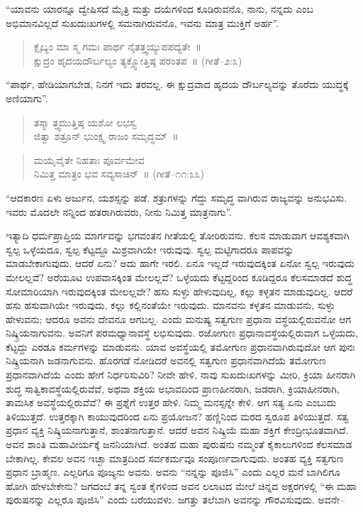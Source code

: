 “ಯಾವನು ಯಾರನ್ನೂ ದ್ವೇಷಿಸದೆ ಮೈತ್ರಿ ಮತ್ತು ದಯೆಗಳಿಂದ ಕೂಡಿರುವನೊ, ನಾನು, ನನ್ನದು ಎಂಬ ಅಭಿಮಾನವಿಲ್ಲದೆ ಸುಖದುಃಖಗಳಲ್ಲಿ ಸಮನಾಗಿರುವನೊ, ಇವನು ಮಾತ್ರ ಮುಕ್ತಿಗೆ ಅರ್ಹ”.

\begin{verse}
ಕ್ಲೈಬ್ಯಂ ಮಾ ಸ್ಮ ಗಮಃ ಪಾರ್ಥ ನೈತತ್ತ್ವಯ್ಯುಪಪದ್ಯತೇ~॥\\ಕ್ಷುದ್ರಂ ಹೃದಯದೌರ್ಬಲ್ಯಂ ತ್ಯಕ್ತ್ವೋತ್ತಿಷ್ಠ ಪರಂತಪ~॥ (ಗೀತೆ–೨:೩)
\end{verse}

“ಪಾರ್ಥ, ಹೇಡಿಯಾಗಬೇಡ, ನಿನಗೆ ಇದು ತರವಲ್ಲ. ಈ ಕ್ಷುದ್ರವಾದ ಹೃದಯ ದೌರ್ಬಲ್ಯವನ್ನು ತೊರೆದು ಯುದ್ಧಕ್ಕೆ ಅಣಿಯಾಗು”.

\begin{verse}
ತಸ್ಮಾ ತ್ತ್ವಮುತ್ತಿಷ್ಠ ಯಶೋ ಲಭಸ್ವ\\ಜಿತ್ವಾ ಶತ್ರೂನ್​ ಭುಂಕ್ಷ್ವ ರಾಜಂ ಸಮೃದ್ಧಮ್​~॥
\end{verse}

\begin{verse}
ಮಯೈವೈತೇ ನಿಹತಾಃ ಪೂರ್ವಮೇವ\\ನಿಮಿತ್ತ ಮಾತ್ರಂ ಭವ ಸವ್ಯಸಾಚಿನ್​~॥ (ಗೀತೆ–೧೧:೩೩)
\end{verse}

“ಆದಕಾರಣ ಏಳು ಅರ್ಜುನ, ಯಶಸ್ಸನ್ನು ಪಡೆ. ಶತ್ರುಗಳನ್ನು ಗೆದ್ದು ಸಮೃದ್ಧ ವಾಗಿರುವ ರಾಜ್ಯವನ್ನು ಅನುಭವಿಸು. ಇವರು ಮೊದಲೇ ನನ್ನಿಂದ ಹತರಾಗಿರುವರು, ನೀನು ನಿಮಿತ್ತ ಮಾತ್ರನಾಗು”.

ಇತ್ಯಾದಿ ಧರ್ಮಪ್ರಾಪ್ತಿಯ ಮಾರ್ಗವನ್ನು ಭಗವಂತನ ಗೀತೆಯಲ್ಲಿ ತೋರಿರುವನು. ಕೆಲಸ ಮಾಡುವಾಗ ಆವಶ್ಯಕವಾಗಿ ಸ್ವಲ್ಪ ಒಳ್ಳೆಯದೂ, ಸ್ವಲ್ಪ ಕೆಟ್ಟದ್ದೂ ಮಿಶ್ರವಾಗಿಯೇ ಇರುವುವು. ಸ್ವಲ್ಪ ಮಟ್ಟಿಗಾದರೂ ಪಾಪವನ್ನು ಮಾಡಬೇಕಾಗುವುದು. ಆದರೆ ಏನು? ಅದು ಹಾಗೇ ಇರಲಿ. ಏನೂ ಇಲ್ಲದೆ ಇರುವುದಕ್ಕಿಂತ ಏನೋ ಸ್ವಲ್ಪ ಇರುವುದು ಮೇಲಲ್ಲವೆ? ಅರೆಯೂಟ ಉಪವಾಸಕ್ಕಿಂತ ಮೇಲಲ್ಲವೆ? ಒಳ್ಳೆಯದು ಕೆಟ್ಟದ್ದರಿಂದ ಕೂಡಿದ್ದರೂ ಕೆಲಸ\-ಮಾಡದೆ ಶುದ್ಧ ಸೋಮಾರಿಯಾಗಿ ಇರುವುದಕ್ಕಿಂತ ಮೇಲಲ್ಲವೇ? ಹಸು ಸುಳ್ಳು ಹೇಳುವುದಿಲ್ಲ, ಕಲ್ಲು ಕಳ್ಳತನ ಮಾಡುವುದಿಲ್ಲ. ಆದರೆ ಹಸು ಹಸುವಾಗಿಯೇ ಇರುವುದು, ಕಲ್ಲು ಕಲ್ಲಿನಂತೆಯೇ ಇರುವುದು. ಮಾನವನು ಕಳ್ಳತನ ಮಾಡುವನು, ಸುಳ್ಳು ಹೇಳುವನು; ಆದರೂ ಅವನು ದೇವನೂ ಆಗಬಲ್ಲ. ಎಂದು ಮನುಷ್ಯ ಸತ್ವಗುಣ ಪ್ರಧಾನಾ ವಸ್ಥೆಯಲ್ಲಿರುವನೋ ಆಗ ನಿಷ್ಕ್ರಿಯನಾಗುವನು. ಅವನಿಗೆ ಪರಮಧ್ಯಾನಾವಸ್ಥೆ ಲಭಿಸುವುದು. ರಜೋಗುಣ ಪ್ರಧಾನಾವಸ್ಥೆಯಲ್ಲಿರುವಾಗ ಒಳ್ಳೆಯದು, ಕೆಟ್ಟದ್ದು ಎರಡೂ ಕರ್ಮಗಳನ್ನು ಮಾಡುವನು. ಯಾವ ಅವಸ್ಥೆಯಲ್ಲಿ ತಮೋಗುಣ ಪ್ರಧಾನವಾಗಿರುವುದೋ ಆಗ ಪುನಃ ನಿಷ್ಕ್ರಿಯನಾಗಿ ಜಡನಾಗುವನು. ಹೊರಗಡೆ ನೋಡಿದರೆ ಅವನಲ್ಲಿ ಸತ್ವಗುಣ ಪ್ರಧಾನವಾಗಿದೆಯೆ ತಮೋಗುಣ ಪ್ರಧಾನವಾಗಿದೆಯೆ ಎಂದು ಹೇಗೆ ನಿರ್ಧರಿಸುವಿರಿ? ನೀವೇ ಹೇಳಿ, ನಾವು ಸುಖದುಃಖಗಳನ್ನು ಮೀರಿ, ಕ್ರಿಯಾ ಹೀನರಾಗಿ ಶುದ್ಧ ಸಾತ್ವಿಕಾವಸ್ಥೆ\-ಯಲ್ಲಿರುವೆವೆ, ಅಥವಾ ಶಕ್ತಿಯ ಅಭಾವದಿಂದ ಪ್ರಾಣಹೀನರಾಗಿ, ಜಡರಾಗಿ, ಕ್ರಿಯಾಹೀನ\-ರಾಗಿ, ತಾಮಸಿಕ ಅವಸ್ಥೆಯಲ್ಲಿರುವೆವೆ? ಈ ಪ್ರಶ್ನೆಗೆ ಉತ್ತರ ಹೇಳಿ. ನಿಮ್ಮ ಮನಸ್ಸನ್ನೇ ಕೇಳಿ. ಆಗ ಸತ್ಯ ಏನು ಎಂಬುದು ತಿಳಿಯುತ್ತದೆ. ಉತ್ತರಕ್ಕಾಗಿ ಕಾಯುವುದರಿಂದ ಏನು ಪ್ರಯೋಜನ? ಹಣ್ಣಿನಿಂದ ಮರದ ಸ್ವರೂಪ ತಿಳಿಯುತ್ತದೆ. ಸತ್ವ ಪ್ರಧಾನ ವ್ಯಕ್ತಿ ನಿಷ್ಕ್ರಿಯನಾಗುತ್ತಾನೆ, ಶಾಂತನಾಗುತ್ತಾನೆ. ಆದರೆ ಅವನ ನಿಷ್ಕ್ರಿಯೆ ಮಹಾ ಶಕ್ತಿಗೆ ಕೇಂದ್ರೀ\-ಭೂತವಾಗಿದೆ. ಅವನ ಶಾಂತಿ ಮಹಾವೀರ್ಯಕ್ಕೆ ಜನನಿಯಾಗಿದೆ. ಅಂತಹ ಮಹಾ ಪುರುಷನು ನಮ್ಮಂತೆ ಕೈಕಾಲುಗಳಿಂದ ಕೆಲಸಮಾಡ ಬೇಕಾಗಿಲ್ಲ. ಕೇವಲ ಅವನ ಇಚ್ಛಾ ಮಾತ್ರದಿಂದ ಸರ್ವಕರ್ಮವೂ ಸಂಪೂರ್ಣವಾಗುವುದು. ಅಂತಹ ವ್ಯಕ್ತಿ ಸತ್ವಗುಣ ಪ್ರಧಾನ ಬ್ರಾಹ್ಮಣ. ಎಲ್ಲರಿಗೂ ಪೂಜ್ಯನು ಅವನು. ಅವನು “ನನ್ನನ್ನು ಪೂಜಿಸಿ” ಎಂದು ಎಲ್ಲರ ಮನೆ ಬಾಗಿಲಿಗೂ ಹೋಗಿ ಹೇಳಬೇಕೇನು? ಜಗದಂಬೆ ತನ್ನ ಸ್ವಂತ ಕೈಗಳಿಂದ ಅವನ ಲಲಾಟದ ಮೇಲೆ ಚಿನ್ನದ ಅಕ್ಷರಗಳಲ್ಲಿ “ಈ ಮಹಾ ಪುರುಷನನ್ನು ಎಲ್ಲರೂ ಪೂಜಿಸಿ” ಎಂದು ಬರೆಯುವಳು. ಜಗತ್ತು ತಲೆಬಾಗಿ ಅವನನ್ನು ಗೌರವಿಸುವುದು. ಅವನೇ–

